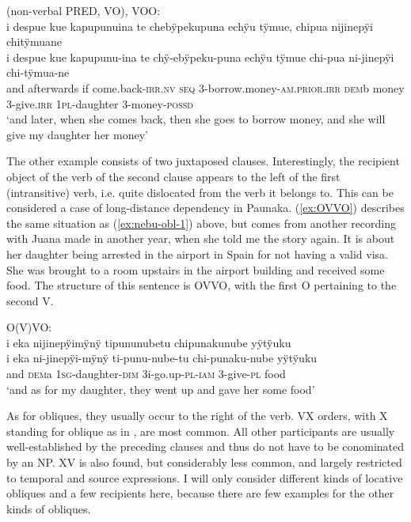 \ea\label{ex:VOO-1}
\begingl
\glpreamble \textup{(non-verbal PRED, VO), VOO:}\\i despue kue kapupunuina te chebÿpekupuna echÿu tÿmue, chipua nijinepÿi \\chitÿmuane\\
\gla i despue kue kapupunu-ina te chÿ-ebÿpeku-puna echÿu tÿmue chi-pua ni-jinepÿi chi-tÿmua-ne\\
\glb and afterwards if come.back-\textsc{irr.nv} \textsc{seq} 3-borrow.money-\textsc{am.prior.irr} \textsc{dem}b money 3-give.\textsc{irr} 1\textsc{pl}-daughter 3-money-\textsc{possd}\\
\glft ‘and later, when she comes back, then she goes to borrow money, and she will give my daughter her money’
\endgl
\trailingcitation{[jxx-p120430l-1.294]}
\xe

The other example consists of two juxtaposed clauses. Interestingly, the recipient object of the verb of the second clause appears to the left of the first (intransitive) verb, i.e. quite dislocated from the verb it belongs to. This can be considered a case of long-distance dependency in Paunaka. (\ref{ex:OVVO}) describes the same situation as (\ref{ex:nebu-obl-1}) above, but comes from another recording with Juana made in another year, when she told me the story again. It is about her daughter being arrested in the airport in Spain for not having a valid visa. She was brought to a room upstairs in the airport building and received some food. The structure of this sentence is OVVO, with the first O pertaining to the second V.

\ea\label{ex:OVVO}
\begingl
\glpreamble \textup{O(V)VO:}\\i eka nijinepÿimÿnÿ tipununubetu chipunakunube yÿtÿuku\\
\gla i eka ni-jinepÿi-mÿnÿ ti-punu-nube-tu chi-punaku-nube yÿtÿuku\\
\glb and \textsc{dem}a 1\textsc{sg}-daughter-\textsc{dim} 3i-go.up-\textsc{pl}-\textsc{iam} 3-give-\textsc{pl} food\\
\glft ‘and as for my daughter, they went up and gave her some food’
\endgl
\trailingcitation{[jxx-p120430l-1.213]}
\xe


As for obliques, they usually occur to the right of the verb. VX orders, with X standing for oblique as in \citet[]{wals-84}, are most common. All other participants are usually well-established by the preceding clauses and thus do not have to be conominated by an NP. XV is also found, but considerably less common, and largely restricted to temporal and source expressions. I will only consider different kinds of locative obliques and a few recipients here, because there are few examples for the other kinds of obliques. 

